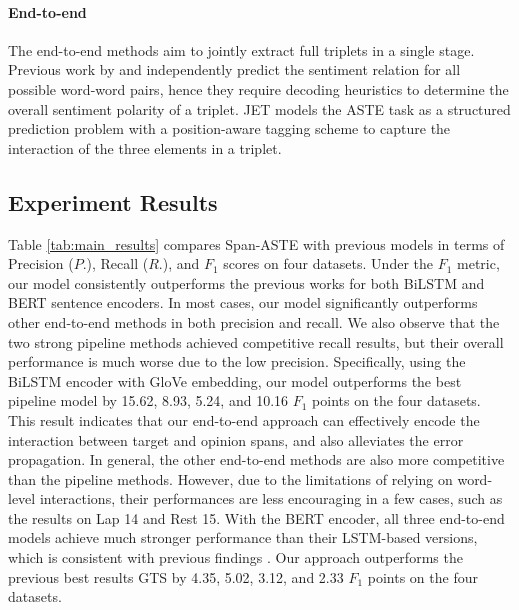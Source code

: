 \documentclass[11pt,a4paper]{article}
\begin{document}
\paragraph{End-to-end} 
The end-to-end methods aim to jointly extract full triplets in a single stage.  
Previous work by \citet{zhang-etal-2020-multi-task} and \citet{wu-etal-2020-grid} independently predict the sentiment relation for all possible word-word pairs, hence they require decoding heuristics to determine the overall sentiment polarity of a triplet. 
JET \cite{Xu2020PositionAwareTF} models the ASTE task as a structured prediction problem with a position-aware tagging scheme to capture the interaction of the three elements in a triplet.

\subsection{Experiment Results}
Table \ref{tab:main_results} 
compares Span-ASTE with previous models in terms of Precision ($P.$), Recall ($R.$), and $F_1$ scores on four datasets. 
Under the $F_1$ metric, our model consistently outperforms the previous works for 
both BiLSTM and BERT sentence encoders.
In most cases, our model significantly outperforms other end-to-end methods in both precision and recall.
We also observe that
the two strong pipeline methods \cite{li2019unified,peng2019knowing} achieved competitive recall results, but
their overall performance is much worse due to the low precision.
Specifically, using the BiLSTM encoder with GloVe embedding, our model outperforms the best pipeline model \cite{peng2019knowing} by 15.62, 8.93, 5.24, and 10.16 $F_1$ points on the four datasets. 
This result indicates that our end-to-end approach can effectively encode the interaction between target and opinion spans, and also alleviates the error propagation. 
In general, the other end-to-end methods are also more competitive than the pipeline methods.
However, due to the limitations of relying on word-level interactions, their performances are less encouraging in a few cases, such as the results on Lap 14 and Rest 15.
With the BERT encoder, all three end-to-end models
achieve much stronger performance than their LSTM-based versions, which 
is consistent with previous findings 
\cite{devlin2019bert}.
Our approach outperforms the previous best results GTS \cite{wu-etal-2020-grid} by 4.35, 5.02,	3.12, and	2.33 $F_1$ points on the four datasets.  
\end{document}
